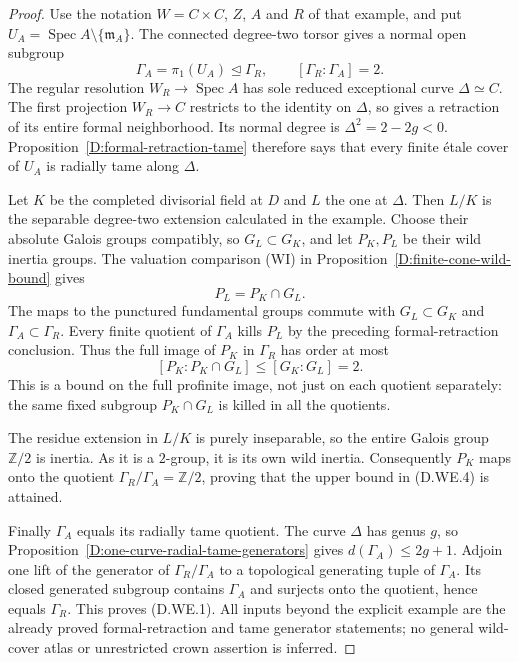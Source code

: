 \begin{proof}
Use the notation $W=C\times C$, $Z$, $A$ and $R$
of that example, and put
$U_A=\operatorname{Spec}A\setminus\{\mathfrak m_A\}$.
The connected degree-two torsor gives a normal open
subgroup
\[
              \Gamma_A=\pi_1(U_A)\mathrel{\trianglelefteq}
                 \Gamma_R,\qquad[\Gamma_R:\Gamma_A]=2.
                                                        \tag{D.WE.2}
\]
The regular resolution $W_R\to\operatorname{Spec}A$
has sole reduced exceptional curve $\Delta\simeq C$.
The first projection $W_R\to C$ restricts to the
identity on $\Delta$, so gives a retraction of its
entire formal neighborhood. Its normal degree is
$\Delta^2=2-2g<0$. Proposition~\ref{D:formal-retraction-tame}
therefore says that every finite \'etale cover of
$U_A$ is radially tame along $\Delta$.

Let $K$ be the completed divisorial field at $D$
and $L$ the one at $\Delta$. Then $L/K$ is the
separable degree-two extension calculated in the
example. Choose their absolute Galois groups
compatibly, so $G_L\subset G_K$, and let $P_K,P_L$
be their wild inertia groups. The valuation comparison
(WI) in Proposition~\ref{D:finite-cone-wild-bound}
gives
\[
                   P_L=P_K\cap G_L.
                                                        \tag{D.WE.3}
\]
The maps to the punctured fundamental groups commute
with $G_L\subset G_K$ and $\Gamma_A\subset\Gamma_R$.
Every finite quotient of $\Gamma_A$ kills $P_L$ by
the preceding formal-retraction conclusion. Thus the
full image of $P_K$ in $\Gamma_R$ has order at most
\[
             [P_K:P_K\cap G_L]\leq[G_K:G_L]=2.
                                                        \tag{D.WE.4}
\]
This is a bound on the full profinite image, not just
on each quotient separately: the same fixed subgroup
$P_K\cap G_L$ is killed in all the quotients.

The residue extension in $L/K$ is purely inseparable,
so the entire Galois group $\mathbb Z/2$ is inertia.
As it is a $2$-group, it is its own wild inertia.
Consequently $P_K$ maps onto the quotient
$\Gamma_R/\Gamma_A=\mathbb Z/2$, proving that the
upper bound in (D.WE.4) is attained.

Finally $\Gamma_A$ equals its radially tame quotient.
The curve $\Delta$ has genus $g$, so
Proposition~\ref{D:one-curve-radial-tame-generators}
gives $d(\Gamma_A)\leq2g+1$. Adjoin one lift of
the generator of $\Gamma_R/\Gamma_A$ to a topological
generating tuple of $\Gamma_A$. Its closed generated
subgroup contains $\Gamma_A$ and surjects onto the
quotient, hence equals $\Gamma_R$. This proves
(D.WE.1). All inputs beyond the explicit example
are the already proved formal-retraction and tame
generator statements; no general wild-cover atlas
or unrestricted crown assertion is inferred.
\end{proof}
